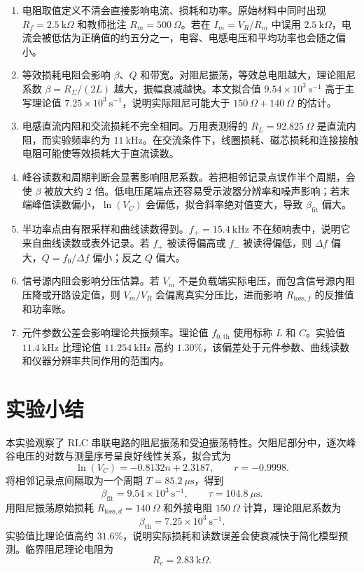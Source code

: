 ﻿\documentclass[UTF8,12pt,a4paper]{ctexart}
\numberwithin{equation}{section}
\begin{document}
\begin{enumerate}[label=\arabic*.,leftmargin=2.2em]
    \item 电阻取值定义不清会直接影响电流、损耗和功率。原始材料中同时出现 \(R_f=2.5\ \mathrm{k}\Omega\) 和教师批注 \(R_m=500\ \Omega\)。若在 \(I_m=V_R/R_m\) 中误用 \(2.5\ \mathrm{k}\Omega\)，电流会被低估为正确值的约五分之一，电容、电感电压和平均功率也会随之偏小。
    \item 等效损耗电阻会影响 \(\beta\)、\(Q\) 和带宽。对阻尼振荡，等效总电阻越大，理论阻尼系数 \(\beta=R_\Sigma/(2L)\) 越大，振幅衰减越快。本文拟合值 \(9.54\times10^3\ \mathrm{s^{-1}}\) 高于主写理论值 \(7.25\times10^3\ \mathrm{s^{-1}}\)，说明实际阻尼可能大于 \(150\ \Omega+140\ \Omega\) 的估计。
    \item 电感直流内阻和交流损耗不完全相同。万用表测得的 \(R_L=92.825\ \Omega\) 是直流内阻，而实验频率约为 \(11\ \mathrm{kHz}\)。在交流条件下，线圈损耗、磁芯损耗和连接接触电阻可能使等效损耗大于直流读数。
    \item 峰谷读数和周期判断会显著影响阻尼系数。若把相邻记录点误作半个周期，会使 \(\beta\) 被放大约 2 倍。低电压尾端点还容易受示波器分辨率和噪声影响；若末端峰值读数偏小，\(\ln(V_C)\) 会偏低，拟合斜率绝对值变大，导致 \(\beta_{\mathrm{fit}}\) 偏大。
    \item 半功率点由有限采样和曲线读数得到。\(f_+=15.4\ \mathrm{kHz}\) 不在频响表中，说明它来自曲线读数或表外记录。若 \(f_+\) 被读得偏高或 \(f_-\) 被读得偏低，则 \(\Delta f\) 偏大，\(Q=f_0/\Delta f\) 偏小；反之 \(Q\) 偏大。
    \item 信号源内阻会影响分压估算。若 \(V_m\) 不是负载端实际电压，而包含信号源内阻压降或开路设定值，则 \(V_m/V_R\) 会偏离真实分压比，进而影响 \(R_{\mathrm{loss},f}\) 的反推值和功率账。
    \item 元件参数公差会影响理论共振频率。理论值 \(f_{0,\mathrm{th}}\) 使用标称 \(L\) 和 \(C\)。实验值 \(11.4\ \mathrm{kHz}\) 比理论值 \(11.254\ \mathrm{kHz}\) 高约 \(1.30\%\)，该偏差处于元件参数、曲线读数和仪器分辨率共同作用的范围内。
\end{enumerate}

\section{实验小结}

本实验观察了 RLC 串联电路的阻尼振荡和受迫振荡特性。欠阻尼部分中，逐次峰谷电压的对数与测量序号呈良好线性关系，拟合式为
\[
    \ln(V_C)=-0.8132n+2.3187,\qquad r=-0.9998.
\]
将相邻记录点间隔取为一个周期 \(T=85.2\ \mu\mathrm{s}\)，得到
\[
    \beta_{\mathrm{fit}}=9.54\times10^3\ \mathrm{s^{-1}},\qquad
    \tau=104.8\ \mu\mathrm{s}.
\]
用阻尼振荡原始损耗 \(R_{\mathrm{loss},d}=140\ \Omega\) 和外接电阻 \(150\ \Omega\) 计算，理论阻尼系数为
\[
    \beta_{\mathrm{th}}=7.25\times10^3\ \mathrm{s^{-1}}.
\]
实验值比理论值高约 \(31.6\%\)，说明实际损耗和读数误差会使衰减快于简化模型预测。临界阻尼理论电阻为
\[
    R_c=2.83\ \mathrm{k}\Omega.
\]
\end{document}
